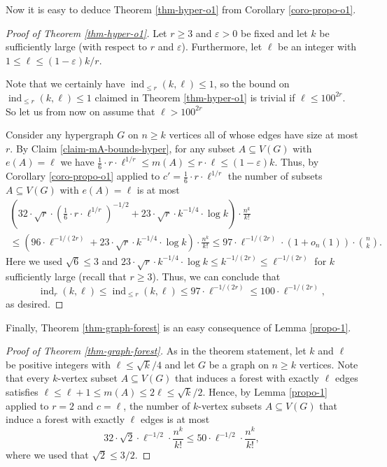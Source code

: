\documentclass[11pt]{article}
\theoremstyle{definition}
\numberwithin{equation}{section}
\begin{document}
Now it is easy to deduce Theorem \ref{thm-hyper-o1} from Corollary \ref{coro-propo-o1}.

\begin{proof}[Proof of Theorem  \ref{thm-hyper-o1}]Let $r\geq 3$ and $\varepsilon>0$ be fixed and let $k$ be sufficiently large (with respect to $r$ and $\varepsilon$). Furthermore, let $\ell$ be an integer with $1 \leq \ell\leq (1-\varepsilon)k/r$. 

Note that we certainly have $\operatorname{ind}_{\leq r}(k,\ell)\leq 1$, so the bound on $\operatorname{ind}_{\leq r}(k,\ell)\leq 1$ claimed in Theorem  \ref{thm-hyper-o1} is trivial if $\ell\leq 100^{2r}$. So let us from now on assume that $\ell> 100^{2r}$

Consider any hypergraph $G$ on $n\geq k$ vertices all of whose edges have size at most $r$. By Claim \ref{claim-mA-bounds-hyper}, for any subset $A\subseteq V(G)$ with $e(A)=\ell$ we have $\frac{1}{6}\cdot r\cdot \ell^{1/r}\leq m(A)\leq r\cdot \ell\leq  (1-\varepsilon)k$. Thus, by Corollary \ref{coro-propo-o1} applied to $c'=\frac{1}{6}\cdot r\cdot \ell^{1/r}$ the number of subsets $A\subseteq V(G)$ with $e(A)=\ell$ is at most
\begin{multline*}\left(32\cdot \sqrt{r}\cdot \left(\frac{1}{6}\cdot r\cdot \ell^{1/r}\right)^{-1/2}+23 \cdot \sqrt{r}\cdot k^{-1/4}\cdot \log k\right)\cdot \frac{n^k}{k!}\\
\leq \left(96\cdot \ell^{-1/(2r)}+23\cdot \sqrt{r} \cdot k^{-1/4}\cdot \log k\right)\cdot \frac{n^k}{k!}
\leq 97\cdot \ell^{-1/(2r)}\cdot (1+o_n(1))\cdot {n\choose k}.
\end{multline*}
Here we used $\sqrt{6}\leq 3$ and $23\cdot \sqrt{r} \cdot k^{-1/4}\cdot \log k\leq k^{-1/(2r)}\leq \ell^{-1/(2r)}$ for $k$ sufficiently large (recall that $r\geq 3$). Thus, we can conclude that
\[\operatorname{ind}_{r}(k,\ell)\leq \operatorname{ind}_{\leq r}(k,\ell)\leq 97\cdot \ell^{-1/(2r)}\leq 100\cdot \ell^{-1/(2r)},\]
as desired.
\end{proof}

Finally, Theorem \ref{thm-graph-forest} is an easy consequence of Lemma \ref{propo-1}.

\begin{proof}[Proof of Theorem \ref{thm-graph-forest}]As in the theorem statement, let $k$ and $\ell$ be positive integers with $\ell\leq \sqrt{k}/4$ and let $G$ be a graph on $n \geq k$ vertices. Note that every $k$-vertex subset $A\subseteq V(G)$ that induces a forest with exactly $\ell$ edges satisfies $\ell\leq \ell+1\leq m(A)\leq 2\ell\leq \sqrt{k}/2$. Hence, by Lemma \ref{propo-1} applied to $r=2$ and $c=\ell$, the number of $k$-vertex subsets $A\subseteq V(G)$ that induce a forest with exactly $\ell$ edges is at most
\[32\cdot \sqrt{2}\cdot \ell^{-1/2}\cdot \frac{n^k}{k!}\leq 50\cdot \ell^{-1/2}\cdot \frac{n^k}{k!},\]
where we used that $\sqrt{2}\leq 3/2$.\end{proof}
\end{document}
